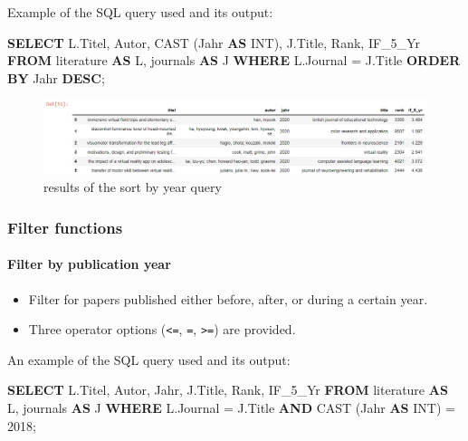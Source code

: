 \documentclass[11pt]{article}
\makeatletter
\def\maxwidth{\ifdim\Gin@nat@width>\linewidth\linewidth
    \else\Gin@nat@width\fi}
\let\Oldincludegraphics\includegraphics
\renewcommand{\includegraphics}[1]{\Oldincludegraphics[width=.8\maxwidth]{#1}}
\providecommand{\tightlist}{%
      \setlength{\itemsep}{0pt}\setlength{\parskip}{0pt}}
\newenvironment{Shaded}{}{}
\newcommand{\KeywordTok}[1]{\textcolor[rgb]{0.00,0.44,0.13}{\textbf{{#1}}}}
\newcommand{\DataTypeTok}[1]{\textcolor[rgb]{0.56,0.13,0.00}{{#1}}}
\newcommand{\DecValTok}[1]{\textcolor[rgb]{0.25,0.63,0.44}{{#1}}}
\newcommand{\FunctionTok}[1]{\textcolor[rgb]{0.02,0.16,0.49}{{#1}}}
\newcommand{\NormalTok}[1]{{#1}}
\makeatother
\begin{document}
Example of the SQL query used and its output:

\begin{Shaded}
\begin{Highlighting}[]
\KeywordTok{SELECT}\NormalTok{ L.Titel, Autor, }\FunctionTok{CAST}\NormalTok{ (Jahr }\KeywordTok{AS} \DataTypeTok{INT}\NormalTok{), J.Title, }\FunctionTok{Rank}\NormalTok{, IF_5_Yr}
\KeywordTok{FROM}\NormalTok{ literature }\KeywordTok{AS}\NormalTok{ L, journals }\KeywordTok{AS}\NormalTok{ J}
\KeywordTok{WHERE}\NormalTok{ L.Journal = J.Title}
\KeywordTok{ORDER} \KeywordTok{BY}\NormalTok{ Jahr }\KeywordTok{DESC}\NormalTok{;}
\end{Highlighting}
\end{Shaded}

\begin{figure}
\centering
\includegraphics{images/sortyear_df.png}
\caption{results of the sort by year query}
\end{figure}

    \subsubsection{Filter functions}\label{filter-functions}

\paragraph{Filter by publication year}\label{filter-by-publication-year}

\begin{itemize}
\tightlist
\item
  Filter for papers published either before, after, or during a certain
  year.
\item
  Three operator options (\texttt{\textless{}=}, \texttt{=},
  \texttt{\textgreater{}=}) are provided.
\end{itemize}

An example of the SQL query used and its output:

\begin{Shaded}
\begin{Highlighting}[]
\KeywordTok{SELECT}\NormalTok{ L.Titel, Autor, Jahr, J.Title, }\FunctionTok{Rank}\NormalTok{, IF_5_Yr}
\KeywordTok{FROM}\NormalTok{ literature }\KeywordTok{AS}\NormalTok{ L, journals }\KeywordTok{AS}\NormalTok{ J}
\KeywordTok{WHERE}\NormalTok{ L.Journal = J.Title}
\KeywordTok{AND} \FunctionTok{CAST}\NormalTok{ (Jahr }\KeywordTok{AS} \DataTypeTok{INT}\NormalTok{) = }\DecValTok{2018}\NormalTok{;}
\end{Highlighting}
\end{Shaded}
\end{document}
